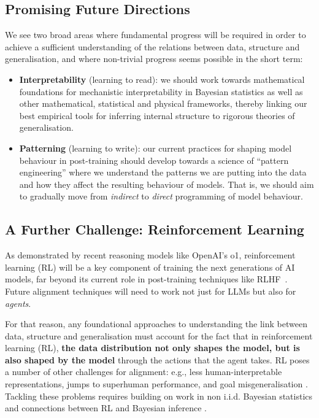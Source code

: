 \subsection{Promising Future Directions}

We see two broad areas where fundamental progress will be required in order to achieve a sufficient understanding of the relations between data, structure and generalisation, and where non-trivial progress seems possible in the short term:
\begin{itemize}
\item \textbf{Interpretability} (learning to read): we should work towards mathematical foundations for mechanistic interpretability in Bayesian statistics as well as other mathematical, statistical and physical frameworks, thereby linking our best empirical tools for inferring internal structure to rigorous theories of generalisation.
\item \textbf{Patterning} (learning to write): our current practices for shaping model behaviour in post-training should develop towards a science of ``pattern engineering'' where we understand the patterns we are putting into the data and how they affect the resulting behaviour of models. That is, we should aim to gradually move from \emph{indirect} to \emph{direct} programming of model behaviour.
\end{itemize}

\subsection{A Further Challenge: Reinforcement Learning}

As demonstrated by recent reasoning models like OpenAI's o1, reinforcement learning (RL) will be a key component of training the next generations of AI models, far beyond its current role in post-training techniques like RLHF~\citep{jaech2024openai,guo2025deepseek}. Future alignment techniques will need to work not just for LLMs but also for \emph{agents}.

For that reason, any foundational approaches to understanding the link between data, structure and generalisation must account for the fact that in reinforcement learning (RL), \textbf{the data distribution not only shapes the model, but is also shaped by the model} through the actions that the agent takes.
%
RL poses a number of other challenges for alignment: e.g., less human-interpretable representations, jumps to superhuman performance, and goal misgeneralisation \citep{langosco2022goal,cohen2024rldontiwouldnt}. Tackling these problems requires building on work in non i.i.d. Bayesian statistics \citep{su2023largedeviationasymptoticsbayesian,adams2024metaposteriorconsistencybayesianinference} and connections between RL and Bayesian inference \citep{levine2018reinforcement}.



